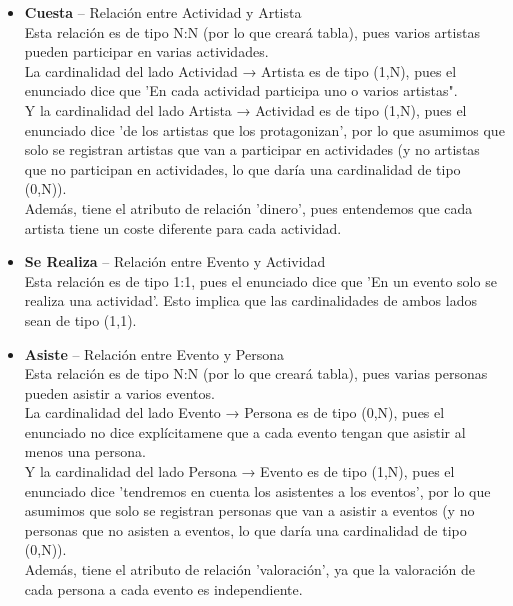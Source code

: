 \documentclass[12pt]{article}
\begin{document}
    \begin{itemize}

        \item \textbf{Cuesta} -- Relación entre Actividad y Artista\\
            Esta relación es de tipo N:N (por lo que creará tabla), pues varios artistas pueden participar en varias actividades. \\
            La cardinalidad del lado Actividad → Artista es de tipo (1,N), pues el enunciado dice que 'En cada actividad participa uno o varios artistas". \\
            Y la cardinalidad del lado Artista → Actividad es de tipo (1,N), pues el enunciado dice 'de los artistas que los protagonizan', por lo que asumimos
            que solo se registran artistas que van a participar en actividades (y no artistas que no participan en actividades, lo que daría una cardinalidad
            de tipo (0,N)). \\
            Además, tiene el atributo de relación 'dinero', pues entendemos que cada artista tiene un coste diferente para cada actividad.
        
        \item \textbf{Se Realiza} -- Relación entre Evento y Actividad\\
            Esta relación es de tipo 1:1, pues el enunciado dice que 'En un evento solo se realiza una actividad'. Esto implica que las cardinalidades
            de ambos lados sean de tipo (1,1).

        \item \textbf{Asiste} -- Relación entre Evento y Persona\\
            Esta relación es de tipo N:N (por lo que creará tabla), pues varias personas pueden asistir a varios eventos. \\
            La cardinalidad del lado Evento → Persona es de tipo (0,N), pues el enunciado no dice explícitamene que a cada evento tengan que asistir al menos
            una persona. \\
            Y la cardinalidad del lado Persona → Evento es de tipo (1,N), pues el enunciado dice 'tendremos en cuenta los asistentes a los eventos', 
            por lo que asumimos que solo se registran personas que van a asistir a eventos (y no personas que no asisten a eventos, lo que daría una cardinalidad
            de tipo (0,N)). \\
            Además, tiene el atributo de relación 'valoración', ya que la valoración de cada persona a cada evento es independiente.
                

\end{itemize}
\end{document}
